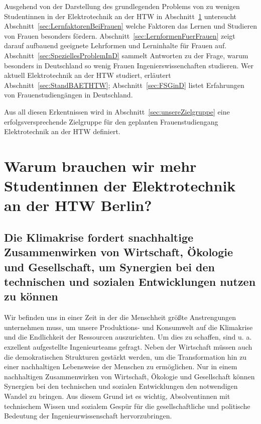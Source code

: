 \documentclass[a4paper, 12 pt]{IEEEtran}
\begin{document}
Ausgehend von der Darstellung des grundlegenden Problems von zu wenigen Studentinnen in der Elektrotechnik an der HTW in Abschnitt~\ref{sec:WarumMehrStudentinnen}
untersucht Abschnitt~\ref{sec:LernfaktorenBeiFrauen}
 welche Faktoren das Lernen und Studieren von  Frauen besonders fördern. Abschnitt~\ref{sec:LernformenFuerFrauen} zeigt darauf aufbauend geeignete Lehrformen und Lerninhalte für Frauen auf.
Abschnitt~\ref{sec:SpeziellesProblemInD} sammelt Antworten zu der Frage, warum besonders in Deutschland so wenig Frauen Ingenierswissenchaften studieren. Wer aktuell Elektrotechnik an der HTW studiert, erläutert Abschnitt~\ref{sec:StandBAETHTW}; Abschnitt~\ref{sec:FSGinD} listet Erfahrungen von Frauenstudiengängen in Deutschland.

Aus all diesen Erkentnissen wird in Abschnitt~\ref{sec:unsereZielgruppe} eine erfolgsversprechende Zielgruppe für den geplanten Frauenstudiengang Elektrotechnik an der HTW definiert.
 
\section{Warum brauchen wir mehr Studentinnen der Elektrotechnik an der HTW Berlin?}
\label{sec:WarumMehrStudentinnen}




\subsection{Die Klimakrise fordert snachhaltige Zusammenwirken von Wirtschaft, Ökologie und Gesellschaft, um Synergien bei den technischen und sozialen Entwicklungen nutzen zu können}
Wir befinden uns in einer Zeit in der die Menschheit größte Anstrengungen unternehmen muss, um unsere Produktions- und Konsumwelt auf die Klimakrise und die Endlichkeit der Ressourcen auszurichten. Um dies zu schaffen, sind u. a. exzellent aufgestellte Ingenieurteams gefragt. Neben der Wirtschaft müssen auch die demokratischen Strukturen gestärkt werden, um die Transformation hin zu einer nachhaltigen Lebensweise der Menschen zu ermöglichen. Nur in einem nachhaltigen Zusammenwirken von Wirtschaft, Ökologie und Gesellschaft können Synergien bei den technischen und sozialen Entwicklungen den notwendigen Wandel zu bringen. Aus diesem Grund ist es wichtig, Absolventinnen mit technischem Wissen und sozialem Gespür für die gesellschaftliche und politische Bedeutung der Ingenieurwissenschaft hervorzubringen.
\end{document}

